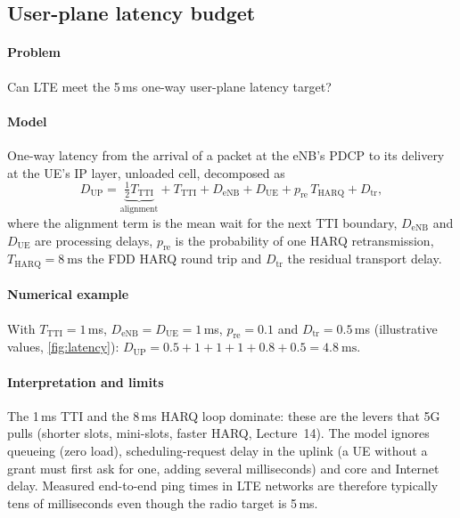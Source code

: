 \documentclass[11pt,a4paper]{article}
\begin{document}
\subsection{User-plane latency budget}\label{sec:latency}
\paragraph{Problem} Can LTE meet the 5\,ms one-way user-plane latency target?
\paragraph{Model} One-way latency from the arrival of a packet at the eNB's PDCP to its delivery
at the UE's IP layer, unloaded cell, decomposed as
\begin{equation}\label{eq:latency}
  D_{\mathrm{UP}} = \underbrace{\tfrac{1}{2}T_{\mathrm{TTI}}}_{\text{alignment}}
  + T_{\mathrm{TTI}} + D_{\mathrm{eNB}} + D_{\mathrm{UE}} + p_{\mathrm{re}}\,T_{\mathrm{HARQ}}
  + D_{\mathrm{tr}},
\end{equation}
where the alignment term is the mean wait for the next TTI boundary, $D_{\mathrm{eNB}}$ and
$D_{\mathrm{UE}}$ are processing delays, $p_{\mathrm{re}}$ is the probability of one HARQ
retransmission, $T_{\mathrm{HARQ}} = \qty{8}{\milli\second}$ the FDD HARQ round trip and
$D_{\mathrm{tr}}$ the residual transport delay.
\paragraph{Numerical example} With $T_{\mathrm{TTI}} = 1$\,ms, $D_{\mathrm{eNB}} = D_{\mathrm{UE}} = 1$\,ms,
$p_{\mathrm{re}} = 0.1$ and $D_{\mathrm{tr}} = 0.5$\,ms (illustrative values, \cref{fig:latency}):
$D_{\mathrm{UP}} = 0.5 + 1 + 1 + 1 + 0.8 + 0.5 = \qty{4.8}{\milli\second}$.
\paragraph{Interpretation and limits} The 1\,ms TTI and the 8\,ms HARQ loop dominate: these are the
levers that 5G pulls (shorter slots, mini-slots, faster HARQ, Lecture~14). The model ignores
queueing (zero load), scheduling-request delay in the uplink (a UE without a grant must first ask
for one, adding several milliseconds) and core and Internet delay. Measured end-to-end ping times
in LTE networks are therefore typically tens of milliseconds even though the radio target is 5\,ms.

\begin{acnfigure}
  \caption{Illustrative one-way downlink user-plane latency budget of \cref{eq:latency} (4.8\,ms).}
  \label{fig:latency}
\end{acnfigure}
\end{document}
